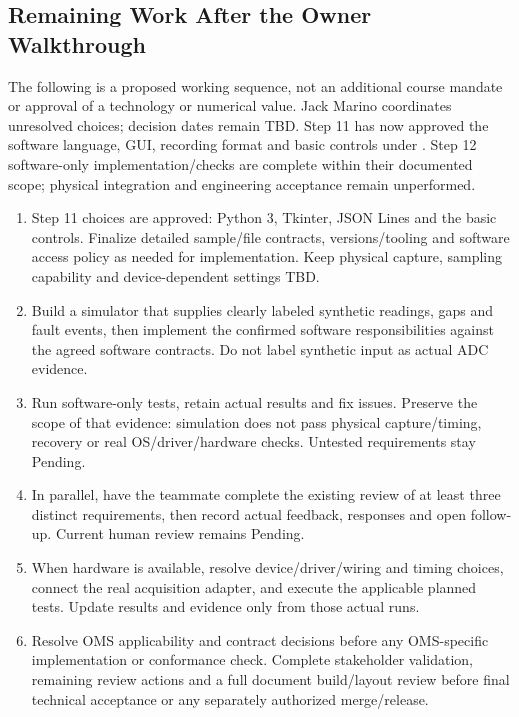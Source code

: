 \subsection{Remaining Work After the Owner Walkthrough}
\label{Section:RemainingSoftwareWork}
The following is a proposed working sequence, not an additional course mandate
or approval of a technology or numerical value. Jack Marino coordinates
unresolved choices; decision dates remain TBD. Step 11 has now approved the software language, GUI, recording format and basic controls under . Step 12 software-only implementation/checks are complete within their documented scope; physical integration and engineering acceptance remain unperformed.
\begin{enumerate}
\item Step 11 choices are approved: Python 3, Tkinter, JSON Lines and the basic controls. Finalize detailed sample/file contracts, versions/tooling and software access policy as needed for implementation.
Keep physical capture, sampling capability and device-dependent settings TBD.
\item Build a simulator that supplies clearly labeled synthetic readings, gaps
and fault events, then implement the confirmed software responsibilities
against the agreed software contracts. Do not label synthetic input as actual ADC evidence.
\item Run software-only tests, retain actual results and fix issues. Preserve the
scope of that evidence: simulation does not pass physical capture/timing,
recovery or real OS/driver/hardware checks. Untested requirements stay Pending.
\item In parallel, have the teammate complete the existing review of at least
three distinct requirements, then record actual feedback, responses and open
follow-up. Current human review remains Pending.
\item When hardware is available, resolve device/driver/wiring and timing choices,
connect the real acquisition adapter, and execute the applicable planned tests.
Update results and evidence only from those actual runs.
\item Resolve OMS applicability and contract decisions before any OMS-specific
implementation or conformance check. Complete stakeholder validation, remaining
review actions and a full document build/layout review before final technical
acceptance or any separately authorized merge/release.
\end{enumerate}

